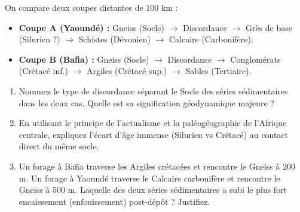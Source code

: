 \documentclass[11pt]{article}
\begin{document}
\begin{exercice}
On compare deux coupes distantes de 100 km :
\begin{itemize}
    \item \textbf{Coupe A (Yaoundé) :} Gneiss (Socle) $\rightarrow$ Discordance $\rightarrow$ Grès de base (Silurien ?) $\rightarrow$ Schistes (Dévonien) $\rightarrow$ Calcaire (Carbonifère).
    \item \textbf{Coupe B (Bafia) :} Gneiss (Socle) $\rightarrow$ Discordance $\rightarrow$ Conglomérats (Crétacé inf.) $\rightarrow$ Argiles (Crétacé sup.) $\rightarrow$ Sables (Tertiaire).
\end{itemize}
\begin{enumerate}
    \item Nommez le type de discordance séparant le Socle des séries sédimentaires dans les deux cas. Quelle est sa signification géodynamique majeure ?
    \item En utilisant le principe de l'actualisme et la paléogéographie de l'Afrique centrale, expliquez l'écart d'âge immense (Silurien vs Crétacé) au contact direct du même socle.
    \item Un forage à Bafia traverse les Argiles crétacées et rencontre le Gneiss à 200 m. Un forage à Yaoundé traverse le Calcaire carbonifère et rencontre le Gneiss à 500 m. Laquelle des deux séries sédimentaires a subi le plus fort encaissement (enfouissement) post-dépôt ? Justifiez.
\end{enumerate}
\end{exercice}
\end{document}
